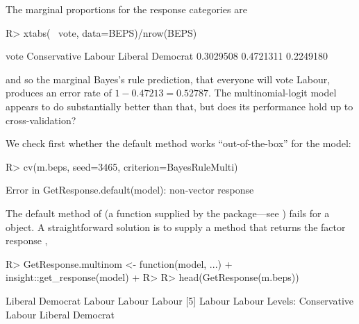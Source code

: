 \documentclass[
]{jss}
\begin{document}
The marginal proportions for the response categories are

\begin{CodeChunk}
\begin{CodeInput}
R> xtabs(~ vote, data=BEPS)/nrow(BEPS)
\end{CodeInput}
\begin{CodeOutput}
vote
    Conservative           Labour Liberal Democrat 
       0.3029508        0.4721311        0.2249180 
\end{CodeOutput}
\end{CodeChunk}

and so the marginal Bayes's rule prediction, that everyone will vote
Labour, produces an error rate of \(1 - 0.47213 = 0.52787\). The
multinomial-logit model appears to do substantially better than that,
but does its performance hold up to cross-validation?

We check first whether the default  method works
``out-of-the-box'' for the  model:

\begin{CodeChunk}
\begin{CodeInput}
R> cv(m.beps, seed=3465, criterion=BayesRuleMulti)
\end{CodeInput}
\begin{CodeOutput}
Error in GetResponse.default(model): non-vector response
\end{CodeOutput}
\end{CodeChunk}

The default method of  (a function supplied by the
 package---see ) fails for a
 object. A straightforward solution is to supply a
 method that returns the factor response
\citep[using the \texttt{get\_response()} function from the
 package,][]{LudeckeWaggonerMakowski:2019},

\begin{CodeChunk}
\begin{CodeInput}
R> GetResponse.multinom <- function(model, ...) {
+   insight::get_response(model)
+ }
R> 
R> head(GetResponse(m.beps))
\end{CodeInput}
\begin{CodeOutput}
[1] Liberal Democrat Labour           Labour           Labour          
[5] Labour           Labour          
Levels: Conservative Labour Liberal Democrat
\end{CodeOutput}
\end{CodeChunk}
\end{document}
